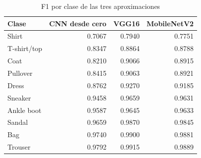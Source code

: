 \begin{table}
\caption{F1 por clase de las tres aproximaciones}
\label{tab:f1_por_clase}
\begin{tabular}{lrrr}
\toprule
Clase & CNN desde cero & VGG16 & MobileNetV2 \\
\midrule
Shirt & 0.7067 & 0.7940 & 0.7751 \\
T-shirt/top & 0.8347 & 0.8864 & 0.8788 \\
Coat & 0.8210 & 0.9066 & 0.8915 \\
Pullover & 0.8415 & 0.9063 & 0.8921 \\
Dress & 0.8762 & 0.9270 & 0.9185 \\
Sneaker & 0.9458 & 0.9659 & 0.9631 \\
Ankle boot & 0.9587 & 0.9645 & 0.9633 \\
Sandal & 0.9659 & 0.9870 & 0.9845 \\
Bag & 0.9740 & 0.9900 & 0.9881 \\
Trouser & 0.9792 & 0.9915 & 0.9889 \\
\bottomrule
\end{tabular}
\end{table}
